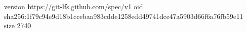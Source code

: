version https://git-lfs.github.com/spec/v1
oid sha256:1f79c94e9d18b1ccebaa983cdde1258edd49741dce47a5903d66f6a76fb59e11
size 2740

